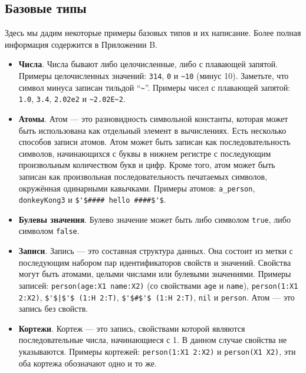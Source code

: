 \subsection{Базовые типы}

Здесь мы дадим некоторые примеры базовых типов и их написание. Более полная информация содержится в Приложении B.

\begin{itemize}

\item{\textbf{Числа}. Числа бывают либо целочисленные, либо с плавающей запятой. Примеры целочисленных значений: \lstinline|314|, \lstinline|0| и \lstinline|~10| (минус 10). Заметьте, что символ минуса записан тильдой ``\lstinline|~|''. Примеры чисел с плавающей запятой: \lstinline|1.0|, \lstinline|3.4|, \lstinline|2.02e2| и \lstinline|~2.02E~2|.}

\item{\textbf{Атомы}. Атом --- это разновидность символьной константы, которая может быть использована как отдельный элемент в вычислениях. Есть несколько способов записи атомов. Атом может быть записан как последовательность символов, начинающихся с буквы в нижнем регистре с последующим произвольным количеством букв и цифр. Кроме того, атом может быть записан как произвольная последовательность печатаемых символов, окружённая одинарными кавычками. Примеры атомов: \lstinline|a_person|, \lstinline|donkeyKong3| и \lstinline|$'$#### hello ####$'$|.}

\item{\textbf{Булевы значения}. Булево значение может быть либо символом \lstinline|true|, либо символом \lstinline|false|.}

\item{\textbf{Записи}. Запись --- это составная структура данных. Она состоит из метки с последующим набором пар идентификаторов свойств и значений. Свойства могут быть атомами, целыми числами или булевыми значениями. Примеры записей: \lstinline|person(age:X1 name:X2)| (со свойствами \lstinline|age| и \lstinline|name|),  \lstinline|person(1:X1 2:X2)|,  \lstinline!$'$|$'$ (1:H 2:T)!, \lstinline!$'$#$'$ (1:H 2:T)!, \lstinline|nil| и \lstinline|person|. Атом --- это запись без свойств.}

\item{\textbf{Кортежи}. Кортеж --- это запись, свойствами которой являются последовательные числа, начинающиеся с 1. В данном случае свойства не указываются. Примеры кортежей: \lstinline|person(1:X1 2:X2)| и \lstinline|person(X1 X2)|, эти оба кортежа обозначают одно и то же.}


\end{itemize}

